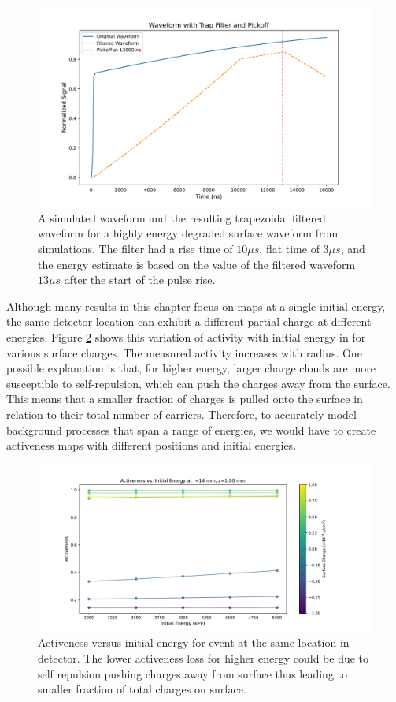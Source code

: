 \begin{figure}%
\centering
\includegraphics[trim={0cm 0cm 0cm 0cm},clip,width=0.9\linewidth]{ch5/figs/trap_example.pdf}
\caption{A simulated waveform and the resulting trapezoidal filtered waveform for a highly energy degraded surface waveform from {\ehd} simulations. The filter had a rise time of $10 \mu s$, flat time of $3 \mu s$, and the energy estimate is based on the value of the filtered waveform $13 \mu s$ after the start of the pulse rise.}
\label{ch5_fig_trap_filter}
\end{figure}

Although many results in this chapter focus on maps at a single initial energy, the same detector location can exhibit a different partial charge at different energies. 
Figure \ref{ch5_fig_act_eng} shows this variation of activity with initial energy in {\ponama} for various surface charges. The measured activity increases with radius. One possible explanation is that, for higher energy, larger charge clouds are more susceptible to self-repulsion, which can push the charges away from the surface. This means that a smaller fraction of charges is pulled onto the surface in relation to their total number of carriers. Therefore, to accurately model background processes that span a range of energies, we would have to create activeness maps with different positions and initial energies.

\begin{figure}%
\centering
\includegraphics[trim={0cm 0cm 0cm 0cm},clip,width=0.95\linewidth]{ch5/figs/activness_vs_eng.pdf}
\caption{Activeness versus initial energy for event at the same location in {\ponama} detector. The lower activeness loss for higher energy could be due to self repulsion pushing charges away from surface thus leading to smaller fraction of total charges on surface.}
\label{ch5_fig_act_eng}
\end{figure}

